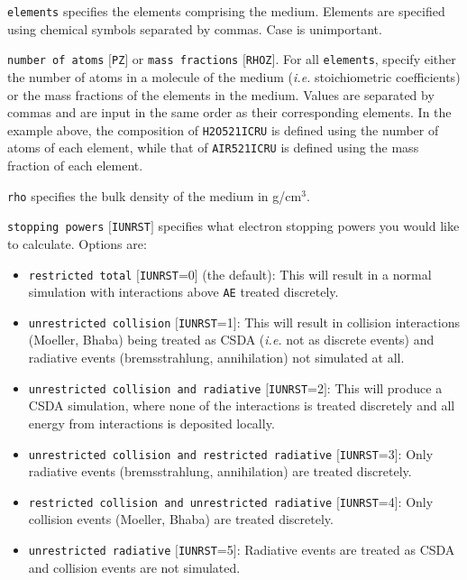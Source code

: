 \documentclass[12pt,twoside]{article}  %
\begin{document}
\begin{description}
\begin{description}
\item {\tt elements} specifies the elements comprising the medium.  Elements are specified using chemical symbols separated by
commas.  Case is unimportant.
\item {\tt number of atoms} $[${\tt PZ}$]$ or {\tt mass fractions} $[${\tt RHOZ}$]$.  For all {\tt elements}, specify either the
number of atoms in a molecule of the medium ({\it i.e.} stoichiometric coefficients) or the mass fractions of the elements in the medium.
Values are separated by commas and are input in the same order as their corresponding elements.  In the example above,
the composition of {\tt H2O521ICRU} is
defined using the number of atoms of each element, while that of {\tt AIR521ICRU} is defined using the mass fraction of each element.
\item {\tt rho} specifies the bulk density of the medium in g/cm$^3$.
\item {\tt stopping powers} $[${\tt IUNRST}$]$ specifies what electron stopping powers you would like to calculate.  Options are:
\begin{itemize}
\item {\tt restricted total} $[${\tt IUNRST}=0$]$ (the default): This will result in a normal simulation with interactions above {\tt AE} treated
discretely.
\item {\tt unrestricted collision} $[${\tt IUNRST}=1$]$: This will result in collision interactions (Moeller, Bhaba) being treated as CSDA ({\it i.e.} not
as discrete events) and radiative events (bremsstrahlung, annihilation) not simulated at all.
\item {\tt unrestricted collision and radiative} $[${\tt IUNRST}=2$]$: This will produce a CSDA simulation, where none of the
interactions is treated discretely and all energy from interactions is deposited locally.
\item {\tt unrestricted collision and restricted radiative} $[${\tt IUNRST}=3$]$: Only radiative events (bremsstrahlung, annihilation)
are treated discretely.
\item {\tt restricted collision and unrestricted radiative} $[${\tt IUNRST}=4$]$: Only collision events (Moeller, Bhaba) are
treated discretely.
\item {\tt unrestricted radiative} $[${\tt IUNRST}=5$]$: Radiative events are treated as CSDA and collision events are not simulated.

\end{itemize}
\end{description}
\end{description}
\end{document}
